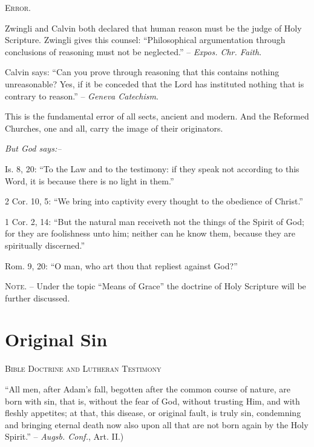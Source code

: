 \documentclass[
]{book}
\begin{document}
\begin{center}
\textsc{Error.}
\end{center}

Zwingli and Calvin both declared that human reason must be the judge of Holy Scripture. Zwingli gives this counsel: ``Philosophical argumentation through conclusions of reasoning must not be neglected.'' -- \emph{Expos. Chr. Faith}.

Calvin says: ``Can you prove through reasoning that this contains nothing unreasonable? Yes, if it be conceded that the Lord has instituted nothing that is contrary to reason.'' -- \emph{Geneva Catechism}.

This is the fundamental error of all sects, ancient and modern. And the Reformed Churches, one and all, carry the image of their originators.

\begin{center}
\textsl{But God says:--}
\end{center}

Is. 8, 20: ``To the Law and to the testimony: if they speak not according to this Word, it is because there is no light in them.''

2 Cor. 10, 5: ``We bring into captivity every thought to the obedience of Christ.''

1 Cor. 2, 14: ``But the natural man receiveth not the things of the Spirit of God; for they are foolishness unto him; neither can he know them, because they are spiritually discerned.''

Rom. 9, 20: ``O man, who art thou that repliest against God?''

\textsc{Note.} -- Under the topic ``Means of Grace'' the doctrine of Holy Scripture will be further discussed.

\hypertarget{original-sin}{%
\section*{\texorpdfstring{Original Sin}{Original Sin}}\label{original-sin}}

\begin{center}
\textsc{Bible Doctrine and Lutheran Testimony}
\end{center}

``All men, after Adam's fall, begotten after the common course of nature, are born with sin, that is, without the fear of God, without trusting Him, and with fleshly appetites; at that, this disease, or original fault, is truly sin, condemning and bringing eternal death now also upon all that are not born again by the Holy Spirit.'' -- \emph{Augsb. Conf.}, Art. II.)
\end{document}
